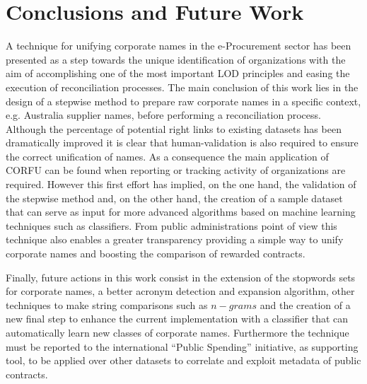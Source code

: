 \documentclass{llncs}
\begin{document}
\section{Conclusions and Future Work}
A technique for unifying corporate names in the e-Procurement sector has been 
presented as a step towards the unique identification of organizations 
with the aim of accomplishing one of the most important LOD principles 
and easing the execution of reconciliation processes. The main conclusion of this work 
lies in the design of a stepwise method to prepare raw corporate names in a specific 
context, e.g. Australia supplier names, before performing a reconciliation process. 
Although the percentage of potential right links to existing datasets has been dramatically 
improved it is clear that human-validation is also required to ensure the 
correct unification of names. As a consequence the main application of CORFU 
can be found when reporting or tracking activity of organizations are required. 
However this first effort has implied, on the one hand, the validation 
of the stepwise method and, on the other hand, the creation of a sample dataset 
that can serve as input for more advanced algorithms based on machine learning 
techniques such as classifiers. From public administrations point of view 
this technique also enables a greater transparency providing a simple 
way to unify corporate names and boosting the comparison of rewarded contracts.

Finally, future actions in this work consist in the extension of the stopwords sets 
for corporate names, a better acronym detection and expansion algorithm, other techniques to 
make string comparisons such as $n-grams$ and the creation of a new final step to enhance 
the current implementation with a classifier that can automatically learn new classes of corporate names. 
Furthermore the technique must be reported to the international ``Public Spending'' initiative, as supporting tool, 
to be applied over other datasets to correlate and exploit metadata of public contracts.




\newpage
\end{document}
